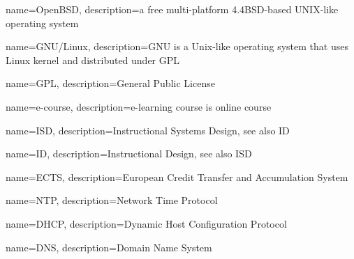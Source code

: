 {
  name=OpenBSD,
  description={a free multi-platform 4.4BSD-based UNIX-like operating system}
}

{
  name=GNU/Linux,
  description={GNU is a Unix-like operating system that uses Linux kernel and distributed under \gls{GPL}}
}


{
  name=GPL,
  description={General Public License}
}

{
  name=e-course,
  description={e-learning course is online course}
}

{
  name=ISD,
  description={Instructional Systems Design, see also \gls{ID}}
}

{
  name=ID,
  description={Instructional Design, see also \gls{ISD}}
}

{
  name=ECTS,
  description={European Credit Transfer and Accumulation System}
}

{
  name=NTP,
  description={Network Time Protocol}
}

{
  name=DHCP,
  description={Dynamic Host Configuration Protocol}
}

{
  name=DNS,
  description={Domain Name System}
}



